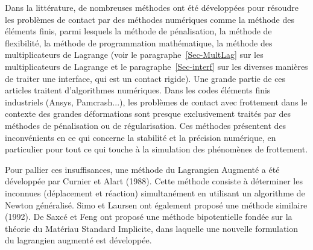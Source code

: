 \medskip
{}

\medskip
Dans la littérature, de nombreuses méthodes ont été développées pour résoudre les problèmes
de contact par des méthodes numériques comme la méthode des éléments finis, parmi lesquels la méthode de pénalisation,
la méthode de flexibilité, la méthode de programmation mathématique, la méthode des
multiplicateurs de
Lagrange
(voir le paragraphe~\ref{Sec-MultLag} sur les multiplicateurs de Lagrange et le
paragraphe~\ref{Sec-interf} sur les diverses manières de traiter une interface, qui est un
contact rigide).
Une grande partie de ces articles traitent d'algorithmes numériques.
Dans les codes éléments finis industriels (Ansys, Pamcrash...), les problèmes de contact avec frottement dans le
contexte des grandes déformations sont presque exclusivement traités par des méthodes de pénalisation
ou de régularisation. Ces méthodes présentent des inconvénients en ce qui concerne la stabilité
et la précision numérique, en particulier pour tout ce qui touche à la simulation des phénomènes de
frottement.

\medskip
Pour pallier ces insuffisances, une méthode du Lagrangien Augmenté a été développée par
Curnier et Alart (1988).
Cette méthode consiste à déterminer les inconnues (déplacement et réaction) simultanément en
utilisant un algorithme de Newton généralisé.
Simo et
Laursen ont également proposé une méthode similaire (1992).
De Saxcé et
Feng ont proposé une méthode bipotentielle fondée
sur la théorie du Matériau Standard Implicite, dans laquelle une nouvelle formulation du lagrangien
augmenté est développée.

